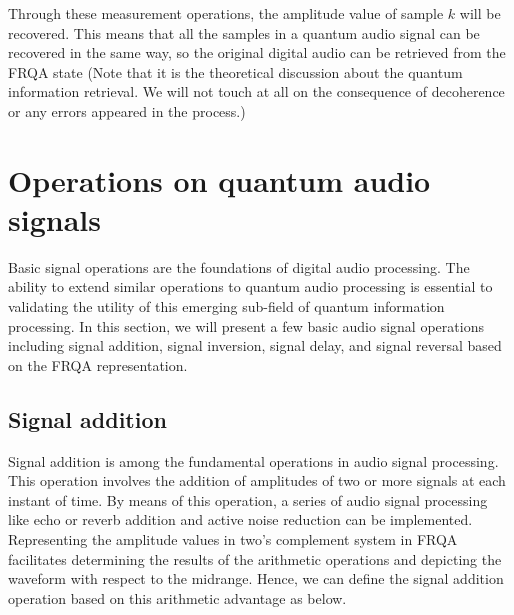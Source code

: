 \documentclass[10pt,journal,compsoc]{IEEEtran}
\begin{document}
Through these measurement operations, the amplitude value of sample $k$ will be recovered. This means that all the samples in a quantum audio signal can be recovered in the same way, so the original digital audio can be retrieved from the FRQA state (Note that it is the theoretical discussion about the quantum information retrieval. We will not touch at all on the consequence of decoherence or any errors appeared in the process.)

\section{Operations on quantum audio signals}\label{sec3}
Basic signal operations are the foundations of digital audio processing. The ability to extend similar operations to quantum audio processing is essential to validating the utility of this emerging sub-field of quantum information processing. In this section, we will present a few basic audio signal operations including signal addition, signal inversion, signal delay, and signal reversal based on the FRQA representation.

\subsection{Signal addition}\label{sec3-1}
Signal addition is among the fundamental operations in audio signal processing. This operation involves the addition of amplitudes of two or more signals at each instant of time. By means of this operation, a series of audio signal processing like echo or reverb addition and active noise reduction can be implemented. Representing the amplitude values in two's complement system in FRQA facilitates determining the results of the arithmetic operations and depicting the waveform with respect to the midrange. Hence, we can define the signal addition operation based on this arithmetic advantage as below.
\end{document}

